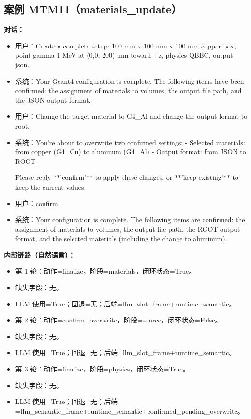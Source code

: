 \documentclass[11pt]{ctexart}
\begin{document}
\subsection{案例 MTM11（materials\_update）}
\textbf{对话：}
\begin{itemize}
\item 用户：Create a complete setup: 100 mm x 100 mm x 100 mm copper box, point gamma 1 MeV at (0,0,-200) mm toward +z, physics QBBC, output json.
\item 系统：Your Geant4 configuration is complete. The following items have been confirmed: the assignment of materials to volumes, the output file path, and the JSON output format.
\item 用户：Change the target material to G4\_Al and change the output format to root.
\item 系统：You're about to overwrite two confirmed settings:
- Selected materials: from copper (G4\_Cu) to aluminum (G4\_Al)
- Output format: from JSON to ROOT

Please reply **'confirm'** to apply these changes, or **'keep existing'** to keep the current values.
\item 用户：confirm
\item 系统：Your configuration is complete. The following items are confirmed: the assignment of materials to volumes, the output file path, the ROOT output format, and the selected materials (including the change to aluminum).
\end{itemize}
\textbf{内部链路（自然语言）：}
\begin{itemize}
\item 第 1 轮：动作=finalize，阶段=materials，闭环状态=True。
\item 缺失字段：无。
\item LLM 使用=True；回退=无；后端=llm\_slot\_frame+runtime\_semantic。
\item 第 2 轮：动作=confirm\_overwrite，阶段=source，闭环状态=False。
\item 缺失字段：无。
\item LLM 使用=True；回退=无；后端=llm\_slot\_frame+runtime\_semantic。
\item 第 3 轮：动作=finalize，阶段=physics，闭环状态=True。
\item 缺失字段：无。
\item LLM 使用=True；回退=无；后端=llm\_semantic\_frame+runtime\_semantic+confirmed\_pending\_overwrite。
\end{itemize}
\end{document}
